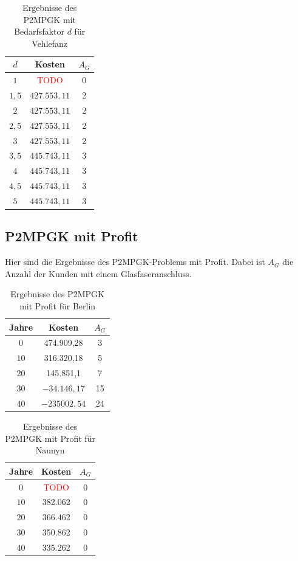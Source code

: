 \documentclass[11pt,a4paper]{article}
\newcommand{\TODO}{\textcolor{red}{TODO}}
\theoremstyle{my_th_style1}
\begin{document}
\begin{table}[!htbp]
	\centering
	\begin{tabular}{c|c|c}
		\centering
		$d$ & Kosten & $A_G$ \\	
		\hline
		$1$   	 &  \TODO& 0  \\
		$1,5$ 	&   $427.553,11$  & 2  \\
		$2$   	&   $427.553,11$ & 2  \\
		$2,5$   	&   $427.553,11$ & 2  \\
		$3$    &   $427.553,11$ & 2  \\
		$3,5$   	&   $445.743,11$ & 3  \\
		$4$   	&   $445.743,11$& 3  \\
		$4,5$    & $445.743,11$ & 3 \\
		$5$   	&   $445.743,11$& 3  \\	
	\end{tabular}
	\label{P2PGKBedarfV}
	\caption{Ergebnisse des P2MPGK mit Bedarfsfaktor $d$ f\"ur Vehlefanz} 
\end{table}
\vspace{5cm}
\subsection*{P2MPGK mit Profit}
Hier sind die Ergebnisse des P2MPGK-Problems mit Profit. Dabei ist $A_G$ die Anzahl der Kunden mit einem Glasfaseranschluss.
\begin{table}[!htbp]
	\centering
	\begin{tabular}{c|c|c}
		\centering
		Jahre & Kosten & $A_G$ \\	
		\hline
		$0$   	 &  474.909,28 & 3  \\
		$10$ 	&  316.320,18 & 5  \\
		$20$   	&   145.851,1 & 7  \\
		$30$    &   $ -34.146,17$	& 15  \\
		$40$    & $-235002,54$ &  24 \\
	\end{tabular}
	\label{P2MPGKProfit}
	\caption{Ergebnisse des P2MPGK mit Profit f\"ur Berlin} 
\end{table}

\begin{table}[!htbp]
	\centering
	\begin{tabular}{c|c|c}
		\centering
		Jahre & Kosten & $A_G$ \\	
		\hline
		$0$   	 &  \TODO& 0  \\
		$10$ 	&  382.062 & 0  \\
		$20$   	&  366.462  & 0  \\
		$30$    &  350.862 & 0  \\
		$40$    &  335.262  & 0 \\
	\end{tabular}
	\label{P2MPGKProfitN}
	\caption{Ergebnisse des P2MPGK mit Profit f\"ur Naunyn} 
\end{table}
\end{document}
